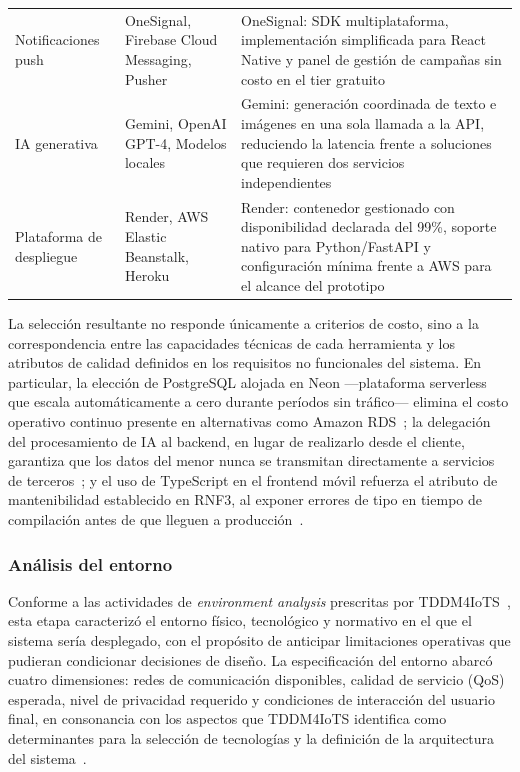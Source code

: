 \begin{longtable}{p{4.5cm}p{4cm}p{5cm}}
						Notificaciones push & OneSignal, Firebase Cloud Messaging, Pusher & OneSignal: SDK multiplataforma, implementación simplificada para React Native y panel de gestión de campañas sin costo en el tier gratuito\\
						IA generativa & Gemini, OpenAI GPT-4, Modelos locales & Gemini: generación coordinada de texto e imágenes en una sola llamada a la API, reduciendo la latencia frente a soluciones que requieren dos servicios independientes~\cite{Sengar2024,Zaleski2026}\\
						Plataforma de despliegue & Render, AWS Elastic Beanstalk, Heroku & Render: contenedor gestionado con disponibilidad declarada del 99\%, soporte nativo para Python/FastAPI y configuración mínima frente a AWS para el alcance del prototipo~\cite{GuerreroUlloa2024}\\
					\end{longtable}
					\vspace{12pt}
					\tblnote
					\endgroup
					
					La selección resultante no responde únicamente a criterios de costo, sino a la correspondencia entre las capacidades técnicas de cada herramienta y los atributos de calidad definidos en los requisitos no funcionales del sistema. En particular, la elección de PostgreSQL alojada en Neon ---plataforma serverless que escala automáticamente a cero durante períodos sin tráfico--- elimina el costo operativo continuo presente en alternativas como Amazon RDS~\cite{Kleppmann2017}; la delegación del procesamiento de IA al backend, en lugar de realizarlo desde el cliente, garantiza que los datos del menor nunca se transmitan directamente a servicios de terceros~\cite{LOPDP2021,GDPR2016}; y el uso de TypeScript en el frontend móvil refuerza el atributo de mantenibilidad establecido en RNF3, al exponer errores de tipo en tiempo de compilación antes de que lleguen a producción~\cite{Fowler2002}.

				\subsubsection{Análisis del entorno}
					Conforme a las actividades de \textit{environment analysis} prescritas por TDDM4IoTS~\cite{GuerreroUlloa2024}, esta etapa caracterizó el entorno físico, tecnológico y normativo en el que el sistema sería desplegado, con el propósito de anticipar limitaciones operativas que pudieran condicionar decisiones de diseño. La especificación del entorno abarcó cuatro dimensiones: redes de comunicación disponibles, calidad de servicio (QoS) esperada, nivel de privacidad requerido y condiciones de interacción del usuario final, en consonancia con los aspectos que TDDM4IoTS identifica como determinantes para la selección de tecnologías y la definición de la arquitectura del sistema~\cite{GuerreroUlloa2024}.
					
